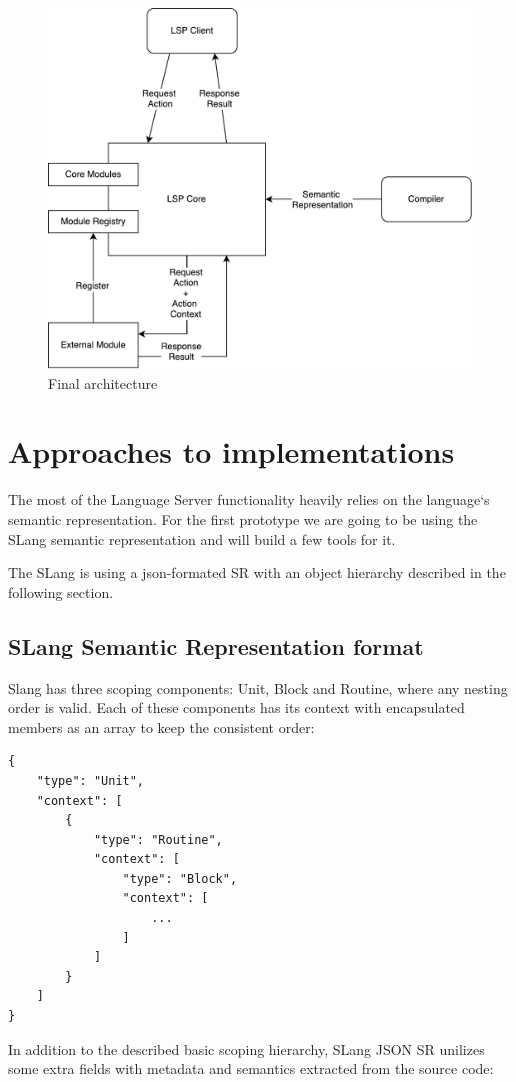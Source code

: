 \begin{figure}[H]
    \centering
    \includegraphics[width=.55\textwidth]{figs/ls_iteration_4.pdf}
    \caption{Final architecture}
    \label{fig:met:final_architecture}
\end{figure}

\newpage

\section{Approaches to implementations}

The most of the Language Server functionality heavily relies on the language`s semantic representation.
For the first prototype we are going to be using the SLang semantic representation and will build a few tools for it.

The SLang is using a json-formated SR with an object hierarchy described in the following section.

\subsection{SLang Semantic Representation format}

Slang has three scoping components: Unit, Block and Routine, where any nesting order is valid.
Each of these components has its context with encapsulated members as an array to
keep the consistent order:

\begin{lstlisting}
{
    "type": "Unit",
    "context": [
        {
            "type": "Routine",
            "context": [
                "type": "Block",
                "context": [
                    ...
                ]
            ]
        }
    ]
}
\end{lstlisting}

In addition to the described basic scoping hierarchy, SLang JSON SR unilizes some extra fields with
metadata and semantics extracted from the source code:


